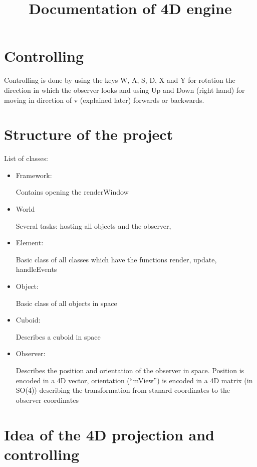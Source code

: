 \documentclass[titlepage]{scrartcl}
\begin{document}
\title{Documentation of 4D engine}

\maketitle


\section{Controlling}
Controlling is done by using the keys W, A, S, D, X and Y for rotation the direction in which the observer looks and using Up and Down (right hand) for moving in direction of v (explained later) forwards or backwards. 


\section{Structure of the project}

List of classes: 

\begin{itemize}
\item Framework: 

Contains opening the renderWindow

\item World

Several tasks: hosting all objects and the observer, 

\item Element:

Basic class of all classes which have the functions render, update, handleEvents

\item Object:

Basic class of all objects in space

\item Cuboid:

Describes a cuboid in space

\item Observer:

Describes the position and orientation of the observer in space. Position is encoded in a 4D vector, orientation (\enquote{mView}) is encoded in a 4D matrix (in SO(4)) describing the transformation from stanard coordinates to the observer coordinates 

\end{itemize}

\section{Idea of the 4D projection and controlling}
\end{document}

